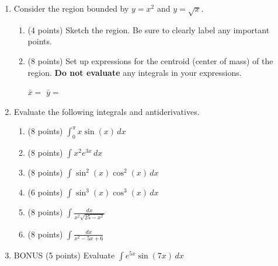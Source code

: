 \documentclass[12pt]{article}
\newcommand{\ds}{\displaystyle}
\begin{document}
\begin{enumerate}
\item Consider the region bounded by $y = x^2$ and $y = \sqrt{x}$.
  \begin{enumerate}
  \item (4 points) Sketch the region. Be sure to clearly label any important points.
    \vspace{6cm}

  \item (8 points) Set up expressions for the
    centroid (center of mass) of the region. {\bf Do not evaluate} any
    integrals in your expressions.
    \vspace{1.5cm}
    
    $\bar{x}=$ \hspace{6cm} $\bar{y} =$
    \vspace{1.5cm}
    
  \end{enumerate}
  

    \newpage

\item Evaluate the following integrals and antiderivatives.
  \begin{enumerate}
  \item (8 points) $\ds \int_0^{\pi} x \sin(x) \, dx$
    \vfill
    
  \item (8 points) $\ds \int x^2 e^{3x} \, dx$
    \vfill
    
    \newpage
  \item (8 points) $\ds \int \sin^2(x) \cos^2(x) \, dx$
    \vfill
    
  \item (6 points) $\ds \int \sin^3(x) \cos^3(x) \, dx$
    \vfill

    \newpage
    
  \item (8 points) $\ds \int \frac{dx}{x^2 \sqrt{25-x^2}}$
    \vfill
    
  \item (8 points) $\ds \int \frac{dx}{x^2-5x+6} $
    \vfill
  \end{enumerate}

  \newpage

\item BONUS (5 points) Evaluate $\ds \int e^{5x} \sin(7x) \, dx$
  
  
\end{enumerate}
\end{document}

